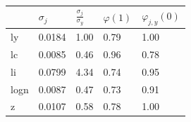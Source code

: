 \begin{tabular}{lllll} 
\hline 
   & $\sigma_{j}$ & $\frac{\sigma_{j}}{\sigma_{y}}$ & $\varphi(1)$ & $\varphi_{j,y}(0)$ \\ 
\hline 
                ly   & 0.0184 & 1.00 & 0.79 & 1.00 \\ 
                lc   & 0.0085 & 0.46 & 0.96 & 0.78 \\ 
                li   & 0.0799 & 4.34 & 0.74 & 0.95 \\ 
                logn & 0.0087 & 0.47 & 0.73 & 0.91 \\ 
                z    & 0.0107 & 0.58 & 0.78 & 1.00 \\ 
\hline 
\end{tabular} 
